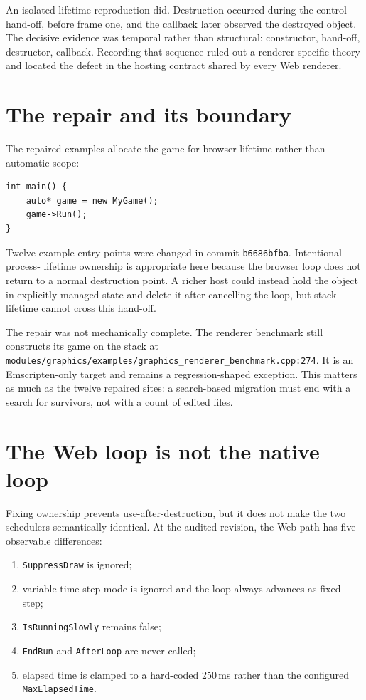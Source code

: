 An isolated lifetime reproduction did.  Destruction occurred during the control hand-off,
before frame one, and the callback later observed the destroyed object.  The decisive evidence
was temporal rather than structural: constructor, hand-off, destructor, callback.  Recording
that sequence ruled out a renderer-specific theory and located the defect in the hosting
contract shared by every Web renderer.

\section{The repair and its boundary}

The repaired examples allocate the game for browser lifetime rather than automatic scope:

\begin{verbatim}
int main() {
    auto* game = new MyGame();
    game->Run();
}
\end{verbatim}

Twelve example entry points were changed in commit \texttt{b6686bfba}.  Intentional process-
lifetime ownership is appropriate here because the browser loop does not return to a normal
destruction point.  A richer host could instead hold the object in explicitly managed state
and delete it after cancelling the loop, but stack lifetime cannot cross this hand-off.

The repair was not mechanically complete.  The renderer benchmark still constructs its game
on the stack at \texttt{modules/graphics/examples/graphics\_renderer\_benchmark.cpp:274}.  It
is an Emscripten-only target and remains a regression-shaped exception.  This matters as much
as the twelve repaired sites: a search-based migration must end with a search for survivors,
not with a count of edited files.

\section{The Web loop is not the native loop}

Fixing ownership prevents use-after-destruction, but it does not make the two schedulers
semantically identical.  At the audited revision, the Web path has five observable differences:

\begin{enumerate}
  \item \texttt{SuppressDraw} is ignored;
  \item variable time-step mode is ignored and the loop always advances as fixed-step;
  \item \texttt{IsRunningSlowly} remains false;
  \item \texttt{EndRun} and \texttt{AfterLoop} are never called;
  \item elapsed time is clamped to a hard-coded 250\,ms rather than the configured
        \texttt{MaxElapsedTime}.
\end{enumerate}

